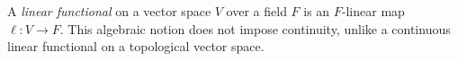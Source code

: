 
A \emph{linear functional} on a vector space $V$ over a field $F$ is an $F$-linear map $\ell:V\to F$. This algebraic notion does not impose continuity, unlike a continuous linear functional on a topological vector space.
